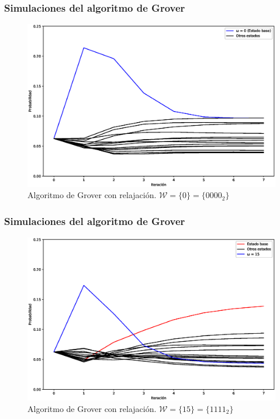 \documentclass[xetex,mathserif,serif, 8pt]{beamer}
\begin{document}
\begin{frame}
    \frametitle{Simulaciones del algoritmo de Grover}

    \begin{figure}[H]
        \centering
        \includegraphics[width=0.99\linewidth]{img/grover0000loss.eps}
        \caption{Algoritmo de Grover con relajación. $\mathcal{W} = \{0\} = \{0000_2\}$}
    \end{figure}

\end{frame}

\begin{frame}
    \frametitle{Simulaciones del algoritmo de Grover}

    \begin{figure}[H]
        \centering
        \includegraphics[width=0.99\linewidth]{img/groverallloss.eps}
        \caption{$\omega = 15$}
        \caption{Algoritmo de Grover con relajación. $\mathcal{W} = \{15\} = \{1111_2\}$}
    \end{figure}

\end{frame}
\end{document}
